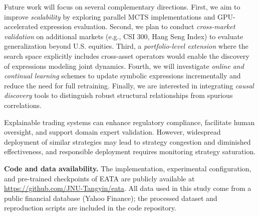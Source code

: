 Future work will focus on several complementary directions. First, we aim to improve \textit{scalability} by exploring parallel MCTS implementations and GPU-accelerated expression evaluation. Second, we plan to conduct \textit{cross-market validation} on additional markets (e.g., CSI 300, Hang Seng Index) to evaluate generalization beyond U.S. equities. Third, a \textit{portfolio-level extension} where the search space explicitly includes cross-asset operators would enable the discovery of expressions modeling joint dynamics. Fourth, we will investigate \textit{online and continual learning} schemes to update symbolic expressions incrementally and reduce the need for full retraining. Finally, we are interested in integrating \textit{causal discovery} tools to distinguish robust structural relationships from spurious correlations.

Explainable trading systems can enhance regulatory compliance, facilitate human oversight, and support domain expert validation. However, widespread deployment of similar strategies may lead to strategy congestion and diminished effectiveness, and responsible deployment requires monitoring strategy saturation.

\textbf{Code and data availability.} The implementation, experimental configuration, and pre-trained checkpoints of EATA are publicly available at \url{https://github.com/JNU-Tangyin/eata}. All data used in this study come from a public financial database (Yahoo Finance); the processed dataset and reproduction scripts are included in the code repository.